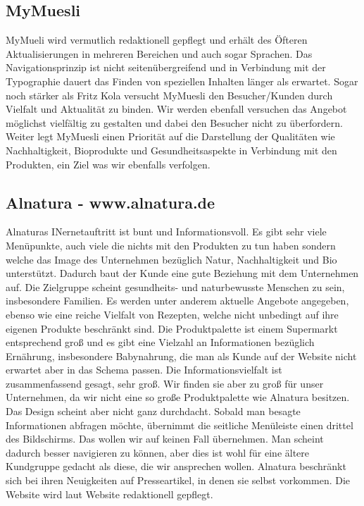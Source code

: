 \documentclass[12pt,a4paper,oneside,ngerman]{article}
\begin{document}
\subsection{MyMuesli} %
MyMueli wird vermutlich redaktionell gepflegt und erhält des Öfteren Aktualisierungen in mehreren Bereichen und auch sogar Sprachen. 
Das Navigationsprinzip ist nicht seitenübergreifend und in Verbindung mit der Typographie dauert das Finden von speziellen Inhalten länger als erwartet.
Sogar noch stärker als Fritz Kola versucht MyMuesli den Besucher/Kunden durch Vielfalt und Aktualität zu binden.
Wir werden ebenfall versuchen das Angebot möglichst vielfältig zu gestalten und dabei den Besucher nicht zu überfordern.
Weiter legt MyMuesli einen Priorität auf die Darstellung der Qualitäten wie Nachhaltigkeit, Bioprodukte und Gesundheitsaspekte in Verbindung mit den Produkten, ein Ziel was wir ebenfalls verfolgen.

\subsection{Alnatura - www.alnatura.de} %
Alnaturas INernetauftritt ist bunt und Informationsvoll. Es gibt sehr viele Menüpunkte, auch viele die nichts mit den Produkten zu tun haben sondern welche das Image des Unternehmen bezüglich Natur, Nachhaltigkeit und Bio unterstützt. Dadurch baut der Kunde eine gute Beziehung mit dem Unternehmen auf. Die Zielgruppe scheint gesundheits- und naturbewusste Menschen zu sein, insbesondere Familien. Es werden unter anderem aktuelle Angebote angegeben, ebenso wie eine reiche Vielfalt von Rezepten, welche nicht unbedingt auf ihre eigenen Produkte beschränkt sind. Die Produktpalette ist einem Supermarkt entsprechend groß und es gibt eine Vielzahl an Informationen bezüglich Ernährung, insbesondere Babynahrung, die man als Kunde auf der Website nicht erwartet aber in das Schema passen. Die Informationsvielfalt ist zusammenfassend gesagt, sehr groß. Wir finden sie aber zu groß für unser Unternehmen, da wir nicht eine so große Produktpalette wie Alnatura besitzen. Das Design scheint aber nicht ganz durchdacht. Sobald man besagte Informationen abfragen möchte, übernimmt die seitliche Menüleiste einen drittel des Bildschirms. Das wollen wir auf keinen Fall übernehmen. Man scheint dadurch besser navigieren zu können, aber dies ist wohl für eine ältere Kundgruppe gedacht als diese, die wir ansprechen wollen. Alnatura beschränkt sich bei ihren Neuigkeiten auf Presseartikel, in denen sie selbst vorkommen. Die Website wird laut Website redaktionell gepflegt.
\end{document}
